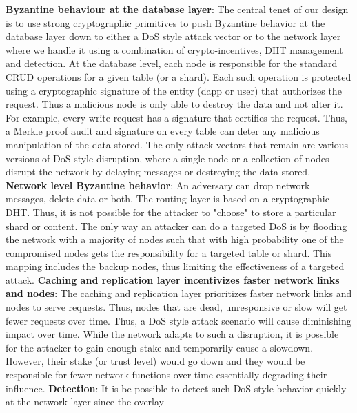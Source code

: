 \textbf{Byzantine behaviour at the database layer}: The central tenet of our design is to use strong cryptographic primitives to push Byzantine behavior at the database layer down to either a DoS style attack vector or to the network layer where we handle it using a combination of crypto-incentives, DHT management and detection. At the database level, each node is responsible for the standard CRUD operations for a given table (or a shard). Each such operation is protected using a cryptographic signature of the entity (dapp or user) that authorizes the request. Thus a malicious node is only able to destroy the data and not alter it. For example, every write request has a signature that certifies the request. Thus, a Merkle proof audit and signature on every table can deter any malicious manipulation of the data stored. The only attack vectors that remain are various versions of DoS style disruption, where a single node or a collection of nodes disrupt the network by delaying messages or destroying the data stored. 
\newline\newline
\textbf{Network level Byzantine behavior}: An adversary can drop network messages, delete data or both. The routing
layer is based on a cryptographic DHT. Thus, it is not possible for the attacker to "choose" to store a particular shard
or content. The only way an attacker can do a targeted DoS is by flooding the network with a majority of nodes such that
with high probability one of the compromised nodes gets the responsibility for a targeted table or shard. This mapping
includes the backup nodes, thus limiting the effectiveness of a targeted attack.
\newline\newline
\textbf{Caching and replication layer incentivizes faster network links and nodes}:
The caching and replication layer prioritizes faster network links and nodes to serve requests. Thus, nodes that are dead, unresponsive or slow will get fewer requests over time. Thus, a DoS style attack scenario will cause diminishing impact over time. While the network adapts to such a disruption, it is possible for the attacker to gain enough stake and temporarily cause a slowdown. However, their stake (or trust level) would go down and they would be responsible for fewer network functions over time essentially degrading their influence.	
\newline\newline
\textbf{Detection}: It is be possible to detect such DoS style behavior quickly at the network layer since the overlay
